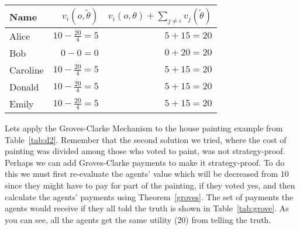 \begin{SCtable}
  \begin{minipage}{1.0\linewidth}
    \begin{center}
      \renewcommand\arraystretch{1.5}
      \begin{tabular}{lrr}\toprule
        Name & $v_i(o, \tilde{\theta})$ &$v_i(o, \theta) + \sum_{j \neq i} v_j(\tilde{\theta})$
        \\ \midrule
        
        Alice  
        &$10 - \frac{20}{4} = 5$
        & $5 + 15 = 20$
        \\ 
        
        Bob  
        &$0 - 0 = 0$
        &$0 +  20 = 20 $
        \\ 
        
        Caroline  
        &$10 - \frac{20}{4} = 5$
        &$5 +  15 = 20$
        \\ 
        
        Donald  
        &$10 - \frac{20}{4} = 5$
        &$5 +  15 = 20$
        \\ 
        
        Emily  
        &$10 - \frac{20}{4} = 5$
        &$5 +  15 = 20$
        \\ \bottomrule
      \end{tabular}
    \end{center}
  \end{minipage}
  \caption{Groves-Clarke payments for house painting assuming that
    all agents tell the truth.}
  \label{tab:grove}
\end{SCtable}

Lets apply the Groves-Clarke Mechanism to the house painting example
from Table~\ref{tab:d2}. Remember that the second solution we tried,
where the cost of painting was divided among those who voted to paint,
was not strategy-proof. Perhaps we can add Groves-Clarke payments to
make it strategy-proof. To do this we must first re-evaluate the
agents' value which will be decreased from 10 since they might have to
pay for part of the painting, if they voted yes, and then calculate
the agents' payments using Theorem~\ref{groves}. The set of payments
the agents would receive if they all told the truth is shown in
Table~\ref{tab:grove}. As you can see, all the agents get the same
utility (20) from telling the truth.

